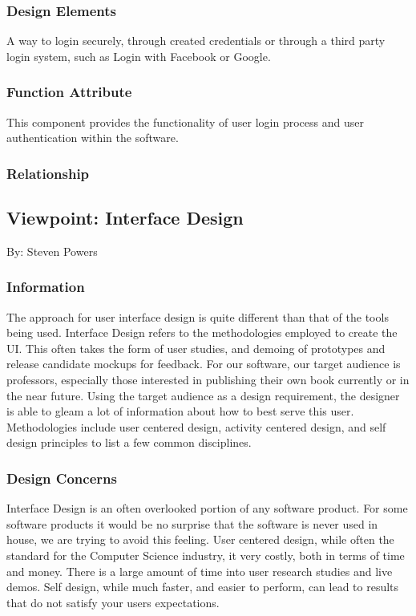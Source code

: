 \documentclass[letterpaper, 10pt, draftclsnofoot, compsoc, onecolumn]{IEEEtran}
\begin{document}
\subsubsection{Design Elements}
{\noindent A way to login securely, through created credentials or through a
third party login system, such as Login with Facebook or Google.  \par}

\subsubsection{Function Attribute}
{\noindent This component provides the functionality of user login process
and user authentication within the software.\par}

\subsubsection{Relationship}



\subsection{Viewpoint: Interface Design}
{\noindent By: Steven Powers \par}

\subsubsection{Information}
{\noindent The approach for user interface design is quite different
than that of the tools being used. Interface Design refers to the
methodologies employed to create the UI. This often takes the form of
user studies, and demoing of prototypes and release candidate mockups
for feedback. For our software, our target audience is professors,
especially those interested in publishing their own book currently or
in the near future. Using the target audience as a design requirement,
the designer is able to gleam a lot of information about how to best
serve this user.
Methodologies include user centered design, activity centered design,
and self design principles to list a few common disciplines.   \par}

\subsubsection{Design Concerns}
{\noindent Interface Design is an often overlooked portion of any software product.
For some software products it would be no surprise that the software is never
used in house, we are trying to avoid this feeling.
User centered design, while often the standard for the Computer Science industry, it
very costly, both in terms of time and money. There is a large amount of time into
user research studies and live demos. Self design, while much faster,
and easier to perform, can lead to results that do not satisfy your users expectations.\par}
\end{document}
